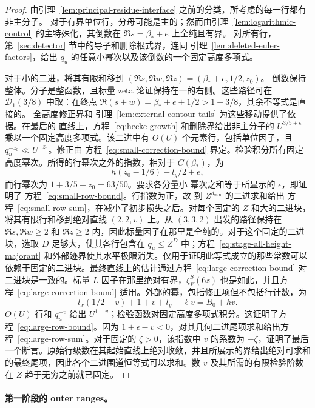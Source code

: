 \documentclass[11pt,a4paper]{article}
\numberwithin{equation}{section}
\numberwithin{figure}{section}
\theoremstyle{definition}
\theoremstyle{remark}
\begin{document}
\begin{proof}
由引理~\ref{lem:principal-residue-interface} 之前的分类，所考虑的每一行都有非主分子。
对于有界单位行，分母可能是主的；然而由引理~\ref{lem:logarithmic-control} 的主特殊化，其倒数在 $\Re s=\beta_*+e$ 上全纯且有界。
对所有行，第~\ref{sec:detector} 节中的导子和删除根式界，连同
引理~\ref{lem:deleted-euler-factors}，给出 $q_u$ 的任意小幂次以及该倒数的一个固定高度多项式。

对于小的二进，将其有限和移到
$(\Re s,\Re w,\Re z)=(\beta_*+e,1/2,z_0)$。
倒数保持整体。分子是整函数，且标量 zeta 论证保持在一的右侧。这些路径可在
$\mathcal D_1(3/8)$ 中取：在终点
$\Re(s+w)=\beta_*+e+1/2>1+3/8$，其余不等式是直接的。
全高度修正界和
引理~\ref{lem:external-contour-tails} 为这些移动提供了依据。在最后的
直线上，方程~\eqref{eq:hecke-growth} 和删除界给出非主分子的
$U^{3/5+\epsilon}$ 乘以一个固定高度多项式。该二进中有 $O(U)$ 个元素行，包括单位因子，且 $q_u^{-z_0}\ll U^{-z_0}$。修正由
方程~\eqref{eq:small-correction-bound} 界定。检验积分所有固定
高度幂次。所得的行幂次之外的指数，相对于 $C(\beta_*)$，为
\[
 h(z_0-1/6)-l_y/2+e,
\]
而行幂次为 $1+3/5-z_0=63/50$。要求各分量小
幂次之和等于所显示的 $\epsilon$，即证明了
方程~\eqref{eq:small-row-bound}。行指数为正，故
到 $Z^{d_{\min}}$ 的二进求和给出
方程~\eqref{eq:small-row-sum}，在减小了初步损失之后。对每个固定的 $Z$ 和大的二进块，将其有限行和移到绝对直线 $(2,2,v)$ 上。从 $(3,3,2)$ 出发的路径保持在 $\Re s,\Re w\ge2$ 和 $\Re z\ge2$ 内，因此标量因子在那里是全纯的。对于这个固定的二进块，选取 $D$ 足够大，使其各行包含在 $q_u\le Z^D$ 中；方程~\eqref{eq:stage-all-height-majorant} 和外部迹界使其水平极限消失。仅用于证明此等式成立的那些常数可以依赖于固定的二进块。最终直线上的估计通过方程~\eqref{eq:large-correction-bound} 对二进块是一致的。标量 $L$ 因子在那里绝对有界，$\zeta_F^S(6z)$ 也是如此，并且方程~\eqref{eq:large-correction-bound} 适用。外部的幂，包括修正项但不包括行计数，为
\[
 l_x(1/2-v)+1+v+l_y+\ell v=B_0+hv.
\]
$O(U)$ 行和 $q_u^{-v}$ 给出 $U^{1-v}$；检验函数对固定高度多项式积分。这证明了方程~\eqref{eq:large-row-bound}。因为 $1+\epsilon-v<0$，对其几何二进尾项求和给出方程~\eqref{eq:large-row-sum}。对于固定的 $\zeta>0$，该指数中 $v$ 的系数为 $-\zeta$，证明了最后一个断言。原始行级数在其起始直线上绝对收敛，并且所展示的界给出绝对可求和的最终尾项，因此各个二进围道恒等式可以求和。数 $v$ 及其所需的有限检验阶数在 $Z$ 趋于无穷之前就已固定。
\end{proof}

\paragraph{第一阶段的 outer ranges。}
\end{document}
